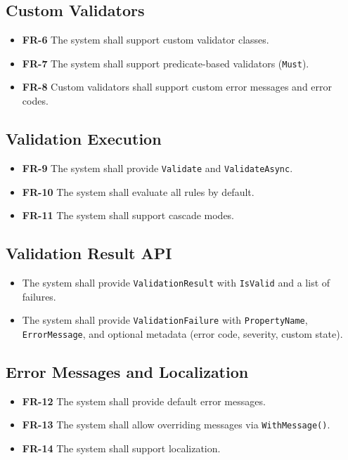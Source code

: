 \documentclass[12pt,technote]{IEEEtran}
\begin{document}
\subsection{Custom Validators}
\begin{itemize}[noitemsep]
    \item \textbf{FR-6} The system shall support custom validator classes.
    \item \textbf{FR-7} The system shall support predicate-based validators (\texttt{Must}).
    \item \textbf{FR-8} Custom validators shall support custom error messages and error codes.
\end{itemize}

\subsection{Validation Execution}
\begin{itemize}[noitemsep]
    \item \textbf{FR-9} The system shall provide \texttt{Validate} and \texttt{ValidateAsync}.
    \item \textbf{FR-10} The system shall evaluate all rules by default.
    \item \textbf{FR-11} The system shall support cascade modes.
\end{itemize}

\subsection{Validation Result API}
\begin{itemize}[noitemsep]
    \item The system shall provide \texttt{ValidationResult} with \texttt{IsValid} and a list of failures.
    \item The system shall provide \texttt{ValidationFailure} with \texttt{PropertyName}, \texttt{ErrorMessage}, and optional metadata (error code, severity, custom state).
\end{itemize}

\subsection{Error Messages and Localization}
\begin{itemize}[noitemsep]
    \item \textbf{FR-12} The system shall provide default error messages.
    \item \textbf{FR-13} The system shall allow overriding messages via \texttt{WithMessage()}.
    \item \textbf{FR-14} The system shall support localization.
\end{itemize}
\end{document}
